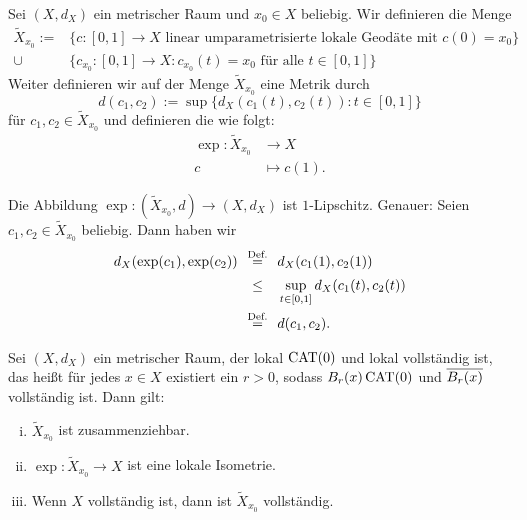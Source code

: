\begin{definition}[Exponentialabbildung]
\label{def:2.29}
	Sei $(X,d_X)$ ein metrischer Raum und $x_0 \in X$ beliebig.
	Wir definieren die Menge
	\begin{align*}
		\tilde{X}_{x_0} := &\{c \colon [0,1] \rightarrow X \text{ linear umparametrisierte lokale Geodäte mit } c(0) = x_0\} \\
		\cup &\{c_{x_0} \colon [0,1] \rightarrow X : c_{x_0}(t) = x_0 \text{ für alle } t \in [0,1]\}
	\end{align*}
	Weiter definieren wir auf der Menge $\tilde{X}_{x_0}$ eine Metrik durch
	\[
		d(c_1,c_2) := \sup \{ d_X(c_1(t),c_2(t)) : t \in [0,1]\}
	\]
	für $c_1,c_2 \in \tilde{X}_{x_0}$ und definieren die  wie folgt:
	\begin{align*}
		\exp\colon \tilde{X}_{x_0} &\longrightarrow X \\
		c &\longmapsto c(1).
	\end{align*}
\end{definition}	
	
\begin{bemerkung}
\label{bem:2.30}
	Die Abbildung $\exp\colon (\tilde{X}_{x_0},d) \rightarrow  (X,d_X)$ ist $1$-Lipschitz.
	Genauer:
	Seien $c_1,c_2 \in \tilde{X}_{x_0}$ beliebig.
	Dann haben wir
	\begin{align*}
		d_X(\exp(c_1),\exp(c_2)) &\stack{\text{Def.}}{=} d_X(c_1(1),c_2(1)) \\
		&\stack{}{\leq} \sup_{t \in [0,1]} d_X(c_1(t),c_2(t)) \\
		&\stack{\text{Def.}}{=} d(c_1,c_2).
	\end{align*}
\end{bemerkung}

\begin{satz}
\label{satz:2.31}
	Sei $(X,d_X)$ ein metrischer Raum, der lokal $\operatorname{CAT(0)}$ und lokal vollständig ist, das heißt für jedes $x \in X$ existiert ein $r > 0$, sodass $B_r(x) \operatorname{CAT(0)}$ und $\overline{B_r(x)}$ vollständig ist.
	Dann gilt:
	\begin{enumerate}[(i)]
		\item $\tilde{X}_{x_0}$ ist zusammenziehbar.
		\item $\exp\colon \tilde{X}_{x_0} \rightarrow X$ ist eine lokale Isometrie.
		\item Wenn $X$ vollständig ist, dann ist $\tilde{X}_{x_0}$ vollständig.
	\end{enumerate}
\end{satz}

